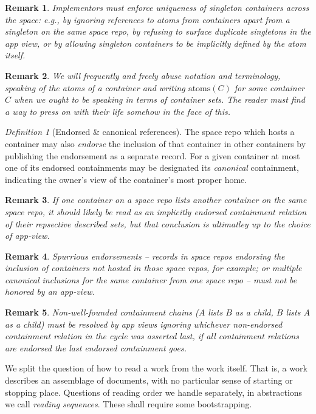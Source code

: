 \documentclass{amsart}
\newtheorem{rem}{Remark}
\theoremstyle{remark}
\newtheorem{defn}{Definition}
\begin{document}
\begin{rem}Implementors \emph{must} enforce uniqueness of singleton containers across the space: e.g., by ignoring references to atoms from containers apart from a singleton on the same space repo, by refusing to surface duplicate singletons in the app view, or by allowing singleton containers to be implicitly defined by the atom itself.\end{rem}
\begin{rem}We will frequently and freely abuse notation and terminology, speaking of the atoms of a container and writing $\mathrm{atoms}(C)$ for some container $C$ when we ought to be speaking in terms of container sets. The reader must find a way to press on with their life somehow in the face of this.\end{rem}
\begin{defn}[Endorsed \& canonical references]The space repo which hosts a container may also \emph{endorse} the inclusion of that container in other containers by publishing the endorsement as a separate record. For a given container at most one of its endorsed containments may be designated its \emph{canonical} containment, indicating the owner's view of the container's most proper home.\end{defn}
\begin{rem}If one container on a space repo lists another container on the same space repo, it should \emph{likely} be read as an implicitly endorsed containment relation of their repsective described sets, but that conclusion is ultimatley up to the choice of app-view.\end{rem}
\begin{rem}Spurrious endorsements -- records in space repos endorsing the inclusion of containers not hosted in those space repos, for example; or multiple canonical inclusions for the same container from one space repo -- must not be honored by an app-view.\end{rem}
\begin{rem}Non-well-founded containment chains ($A$ lists $B$ as a child, $B$ lists $A$ as a child) must be resolved by app views ignoring whichever non-endorsed containment relation in the cycle was asserted last, if all containment relations are endorsed the last endorsed containment goes.\end{rem}

We split the question of how to read a work from the work itself. That is, a work describes an assemblage of documents, with no particular sense of starting or stopping place. Questions of reading order we handle separately, in abstractions we call \emph{reading sequences}. 
These shall require some bootstrapping.
\end{document}
